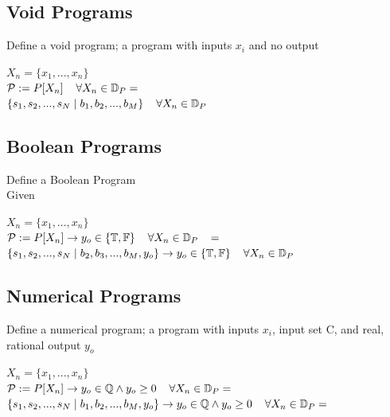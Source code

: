 \documentclass[11pt]{article}
\begin{document}
\subsection{Void Programs}
Define a void program; a program with inputs $x_i$ and no output
\begin{center}
$
X_n = \{x_1,...,x_n\}
$
\\ \vspace{4mm}
$
\mathcal{P} := P\lbrack X_n \rbrack \hspace{4mm} \forall X_n \in \mathbb{D}_P =
$
\\ \vspace{2mm}
$
\{ s_1,s_2,...,s_{N}\hspace{1mm}|\hspace{1mm} b_1, b_2,...,b_M\} \hspace{4mm} \forall X_n \in \mathbb{D}_{P}
$
\end{center}

\subsection{Boolean Programs}
Define a Boolean Program
\\
Given
\begin{center}
$
X_n = \{x_1,...,x_n\}
$
\\ \vspace{4mm}
$\mathcal{P} := P\lbrack X_n \rbrack \rightarrow y_o \in \{ \mathbb{T},\mathbb{F} \} \hspace{4mm} \forall X_n \in \mathbb{D}_{P}  \hspace{3mm} =$
\\ \vspace{2mm}
$
\{ s_1,s_2,...,s_{N}\hspace{1mm}|\hspace{1mm} b_2, b_3,...,b_M,y_o\} \rightarrow y_o \in \{ \mathbb{T},\mathbb{F} \} \hspace{4mm} \forall X_n \in \mathbb{D}_{P} 
$
\end{center}

\subsection{Numerical Programs}
Define a numerical program; a program with inputs $x_i$, input set C, and real, rational output $y_o$
\begin{center}
$
X_n = \{x_1,...,x_n\}
$
\\ \vspace{2mm}
$\mathcal{P} := P\lbrack X_n \rbrack \rightarrow y_o \in \mathbb{Q} \land y_o \geq 0 \hspace{4mm} \forall X_n \in \mathbb{D}_P =$
\\ \vspace{2mm}
$
\{ s_1,s_2,...,s_{N}\hspace{1mm}|\hspace{1mm} b_1, b_2,...,b_M,y_o\} \rightarrow y_o \in \mathbb{Q} \land y_o \geq 0 \hspace{4mm} \forall X_n \in \mathbb{D}_P =
$
\end{center}
\end{document}
